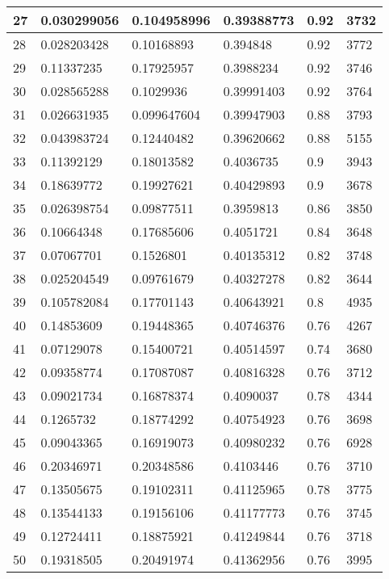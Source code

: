 \begin{longtable}{|l|l|l|l|l|l|}
27 & 0.030299056 & 0.104958996 & 0.39388773 & 0.92 & 3732 \\ \hline 
28 & 0.028203428 & 0.10168893 & 0.394848 & 0.92 & 3772 \\ \hline 
29 & 0.11337235 & 0.17925957 & 0.3988234 & 0.92 & 3746 \\ \hline 
30 & 0.028565288 & 0.1029936 & 0.39991403 & 0.92 & 3764 \\ \hline 
31 & 0.026631935 & 0.099647604 & 0.39947903 & 0.88 & 3793 \\ \hline 
32 & 0.043983724 & 0.12440482 & 0.39620662 & 0.88 & 5155 \\ \hline 
33 & 0.11392129 & 0.18013582 & 0.4036735 & 0.9 & 3943 \\ \hline 
34 & 0.18639772 & 0.19927621 & 0.40429893 & 0.9 & 3678 \\ \hline 
35 & 0.026398754 & 0.09877511 & 0.3959813 & 0.86 & 3850 \\ \hline 
36 & 0.10664348 & 0.17685606 & 0.4051721 & 0.84 & 3648 \\ \hline 
37 & 0.07067701 & 0.1526801 & 0.40135312 & 0.82 & 3748 \\ \hline 
38 & 0.025204549 & 0.09761679 & 0.40327278 & 0.82 & 3644 \\ \hline 
39 & 0.105782084 & 0.17701143 & 0.40643921 & 0.8 & 4935 \\ \hline 
40 & 0.14853609 & 0.19448365 & 0.40746376 & 0.76 & 4267 \\ \hline 
41 & 0.07129078 & 0.15400721 & 0.40514597 & 0.74 & 3680 \\ \hline 
42 & 0.09358774 & 0.17087087 & 0.40816328 & 0.76 & 3712 \\ \hline 
43 & 0.09021734 & 0.16878374 & 0.4090037 & 0.78 & 4344 \\ \hline 
44 & 0.1265732 & 0.18774292 & 0.40754923 & 0.76 & 3698 \\ \hline 
45 & 0.09043365 & 0.16919073 & 0.40980232 & 0.76 & 6928 \\ \hline 
46 & 0.20346971 & 0.20348586 & 0.4103446 & 0.76 & 3710 \\ \hline 
47 & 0.13505675 & 0.19102311 & 0.41125965 & 0.78 & 3775 \\ \hline 
48 & 0.13544133 & 0.19156106 & 0.41177773 & 0.76 & 3745 \\ \hline 
49 & 0.12724411 & 0.18875921 & 0.41249844 & 0.76 & 3718 \\ \hline 
50 & 0.19318505 & 0.20491974 & 0.41362956 & 0.76 & 3995 \\ \hline 
\end{longtable}